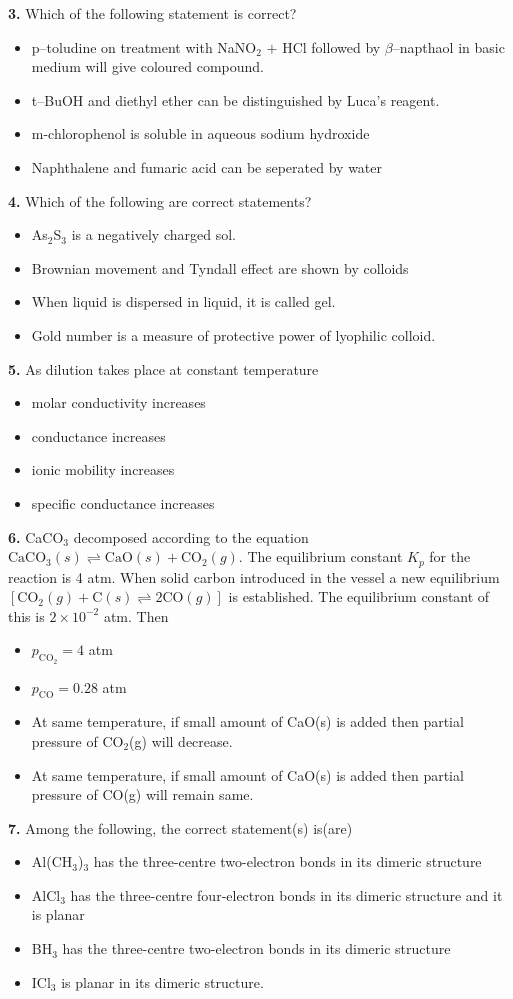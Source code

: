 \documentclass[10pt,twocolumn]{extarticle}
\newenvironment{qoptions}{\begin{itemize}[leftmargin=1.8em,itemsep=2pt,topsep=2pt,label={}]}{\end{itemize}}
\newcommand{\opt}[2]{\item[({#1})] {#2}}
\begin{document}
\textbf{3.} Which of the following statement is correct?

\begin{qoptions}
\opt{A}{p--toludine on treatment with NaNO$_2$ $+$ HCl followed by $\beta$--napthaol in basic medium will give coloured compound.}
\opt{B}{t--BuOH and diethyl ether can be distinguished by Luca's reagent.}
\opt{C}{m-chlorophenol is soluble in aqueous sodium hydroxide}
\opt{D}{Naphthalene and fumaric acid can be seperated by water}
\end{qoptions}

\textbf{4.} Which of the following are correct statements?

\begin{qoptions}
\opt{A}{As$_2$S$_3$ is a negatively charged sol.}
\opt{B}{Brownian movement and Tyndall effect are shown by colloids}
\opt{C}{When liquid is dispersed in liquid, it is called gel.}
\opt{D}{Gold number is a measure of protective power of lyophilic colloid.}
\end{qoptions}

\textbf{5.} As dilution takes place at constant temperature

\begin{qoptions}
\opt{A}{molar conductivity increases}
\opt{B}{conductance increases}
\opt{C}{ionic mobility increases}
\opt{D}{specific conductance increases}
\end{qoptions}

\textbf{6.} CaCO$_3$ decomposed according to the equation $\text{CaCO}_3(s)\rightleftharpoons\text{CaO}(s)+\text{CO}_2(g)$. The equilibrium constant $K_p$ for the reaction is 4 atm. When solid carbon introduced in the vessel a new equilibrium $[\text{CO}_2(g)+\text{C}(s)\rightleftharpoons2\text{CO}(g)]$ is established. The equilibrium constant of this is $2\times10^{-2}$ atm. Then

\begin{qoptions}
\opt{A}{$p_{\text{CO}_2}=4$ atm}
\opt{B}{$p_{\text{CO}}=0.28$ atm}
\opt{C}{At same temperature, if small amount of CaO(s) is added then partial pressure of CO$_2$(g) will decrease.}
\opt{D}{At same temperature, if small amount of CaO(s) is added then partial pressure of CO(g) will remain same.}
\end{qoptions}

\textbf{7.} Among the following, the correct statement(s) is(are)

\begin{qoptions}
\opt{A}{Al(CH$_3$)$_3$ has the three-centre two-electron bonds in its dimeric structure}
\opt{B}{AlCl$_3$ has the three-centre four-electron bonds in its dimeric structure and it is planar}
\opt{C}{BH$_3$ has the three-centre two-electron bonds in its dimeric structure}
\opt{D}{ICl$_3$ is planar in its dimeric structure.}
\end{qoptions}
\end{document}
